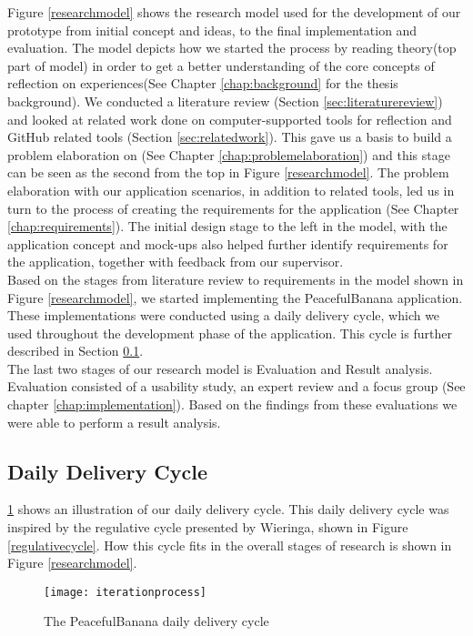 Figure \ref{researchmodel} shows the research model used for the development of our prototype from initial concept and ideas, to the final implementation and evaluation. The model depicts how we started the process by reading theory(top part of model) in order to get a better understanding of the core concepts of reflection on experiences(See Chapter \ref{chap:background} for the thesis background). We conducted a literature review (Section \ref{sec:literaturereview}) and looked at related work done on computer-supported tools for reflection and GitHub related tools (Section \ref{sec:relatedwork}). This gave us a basis to build a problem elaboration on (See Chapter \ref{chap:problemelaboration}) and this stage can be seen as the second from the top in Figure \ref{researchmodel}. The problem elaboration with our application scenarios, in addition to related tools, led us in turn to the process of creating the requirements for the application (See Chapter \ref{chap:requirements}). The initial design stage to the left in the model, with the application concept and mock-ups also helped further identify requirements for the application, together with feedback from our supervisor. \\
Based on the stages from literature review to requirements in the model shown in Figure \ref{researchmodel}, we started implementing the PeacefulBanana application. These implementations were conducted using a daily delivery cycle, which we used throughout the development phase of the application. This cycle is further described in Section \ref{sec:dailydeliverycycle}. \\
The last two stages of our research model is Evaluation and Result analysis. Evaluation consisted of a usability study, an expert review and a focus group (See chapter \ref{chap:implementation}). Based on the findings from these evaluations we were able to perform a result analysis. 

\subsection{Daily Delivery Cycle}
\label{sec:dailydeliverycycle}

 \ref{iterationprocess} shows an illustration of our daily delivery cycle. This daily delivery cycle was inspired by the regulative cycle presented by Wieringa\citep{wieringa}, shown in Figure \ref{regulativecycle}. How this cycle fits in the overall stages of research is shown in Figure \ref{researchmodel}.
\begin{figure}[!htpb]
\centering
	\texttt{[image: iterationprocess]}
\caption{The PeacefulBanana daily delivery cycle}
\label{iterationprocess}
\end{figure}

